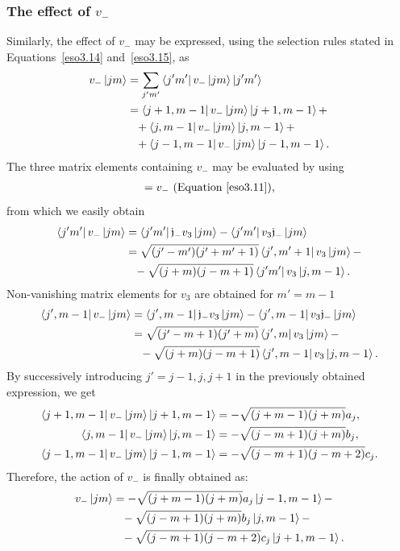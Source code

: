 \documentclass[12pt,a4paper]{report}
\theoremstyle{definition}
\theoremstyle{remark}
\theoremstyle{remark}
\begin{document}
\subsubsection{The effect of $v_-$}
Similarly, the effect of $v_-$ may be expressed, using the selection rules stated in Equations~\ref{eso3.14} and~\ref{eso3.15}, as
\begin{align*}
v_-\ket{jm}&=\sum_{j'm'}\bra{j'm'}v_-\ket{jm}\ket{j'm'}\\
&=\bra{j+1,m-1}v_-\ket{jm}\ket{j+1,m-1}+\\
&\phantom{=}+\bra{j,m-1}v_-\ket{jm}\ket{j,m-1}+\\
&\phantom{=}+\bra{j-1,m-1}v_-\ket{jm}\ket{j-1,m-1}.
\end{align*}
The three matrix elements containing $v_-$ may be evaluated by using
\begin{align*}
[\mathfrak{j}_-,v_3]=v_- \text{ (Equation~\ref{eso3.11})},
\end{align*}
from which we easily obtain
\begin{align*}
\bra{j'm'}v_-\ket{jm}&=\bra{j'm'}\mathfrak{j}_-v_3\ket{jm}-\bra{j'm'}v_3\mathfrak{j}_-\ket{jm}\\
&=\sqrt{(j'-m')(j'+m'+1)}\bra{j',m'+1}v_3\ket{jm}-\\
&\phantom{=}-\sqrt{(j+m)(j-m+1)}\bra{j'm'}v_3\ket{j,m-1}.
\end{align*}
Non-vanishing matrix elements for $v_3$ are obtained for $m'=m-1$
\begin{align*}
\bra{j',m-1}v_-\ket{jm}&=\bra{j',m-1}\mathfrak{j}_-v_3\ket{jm}-\bra{j',m-1}v_3\mathfrak{j}_-\ket{jm}\\
&=\sqrt{(j'-m+1)(j'+m)}\bra{j',m}v_3\ket{jm}-\\
&\phantom{=}-\sqrt{(j+m)(j-m+1)}\bra{j',m-1}v_3\ket{j,m-1}.
\end{align*}
By successively introducing $j'=j-1,j,j+1$ in the previously obtained expression, we get
\begin{equation}\label{eso3.21}
\begin{aligned}
\bra{j+1,m-1}v_-\ket{jm}\ket{j+1,m-1}&=-\sqrt{(j+m-1)(j+m)}a_j,\\
\bra{j,m-1}v_-\ket{jm}\ket{j,m-1}&=-\sqrt{(j-m+1)(j+m)}b_j,\\
\bra{j-1,m-1}v_-\ket{jm}\ket{j-1,m-1}&=-\sqrt{(j-m+1)(j-m+2)}c_j.
\end{aligned}
\end{equation}
Therefore, the action of $v_-$ is finally obtained as:
\begin{equation}\label{eso3.19}
\begin{aligned}
v_-\ket{jm}&=-\sqrt{(j+m-1)(j+m)}a_j\ket{j-1,m-1}-\\
&\phantom{=}-\sqrt{(j-m+1)(j+m)}b_j\ket{j,m-1}-\\
&\phantom{=}-\sqrt{(j-m+1)(j-m+2)}c_j\ket{j+1,m-1}.
\end{aligned}
\end{equation}
\end{document}
